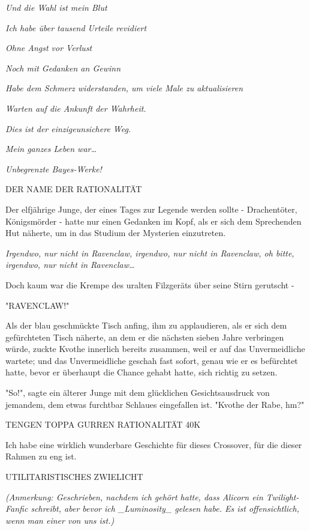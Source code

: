 {\emph{\emph{Und} \emph{die} \emph{Wahl ist mein Blut}}

\emph{Ich habe über tausend Urteile revidiert}

\emph{Ohne Angst vor Verlust}

\emph{\emph{Noch} \emph{mit Gedanken an} \emph{Gewinn}}

\emph{Habe dem Schmerz widerstanden, um viele Male zu aktualisieren}

\emph{Warten auf die Ankunft der Wahrheit.}

\emph{\emph{Dies ist der einzigeunsichere Weg.}}

\emph{Mein ganzes Leben war…}

\emph{Unbegrenzte Bayes-Werke!}

DER NAME DER RATIONALITÄT

Der elfjährige Junge, der eines Tages zur Legende werden sollte - Drachentöter, Königsmörder - hatte nur einen Gedanken im Kopf, als er sich dem Sprechenden Hut näherte, um in das Studium der Mysterien einzutreten.

\emph{Irgendwo, nur nicht in Ravenclaw, irgendwo, nur nicht in Ravenclaw, oh bitte, irgendwo, nur nicht in Ravenclaw…}

Doch kaum war die Krempe des uralten Filzgeräts über seine Stirn gerutscht -

"RAVENCLAW!"

Als der blau geschmückte Tisch anfing, ihm zu applaudieren, als er sich dem gefürchteten Tisch näherte, an dem er die nächsten sieben Jahre verbringen würde, zuckte Kvothe innerlich bereits zusammen, weil er auf das Unvermeidliche wartete; und das Unvermeidliche geschah fast sofort, genau wie er es befürchtet hatte, bevor er überhaupt die Chance gehabt hatte, sich richtig zu setzen.

"So!", sagte ein älterer Junge mit dem glücklichen Gesichtsausdruck von jemandem, dem etwas furchtbar Schlaues eingefallen ist. "Kvothe der Rabe, hm?"

TENGEN TOPPA GURREN RATIONALITÄT 40K

Ich habe eine wirklich wunderbare Geschichte für dieses Crossover, für die dieser Rahmen zu eng ist.

UTILITARISTISCHES ZWIELICHT

\emph{\emph{(Anmerkung: Geschrieben, nachdem ich gehört hatte, dass} \emph{Alicorn} \emph{ein Twilight-Fanfic} \emph{schreibt, aber bevor ich \_Luminosity\_ gelesen habe. Es ist offensichtlich, wenn man einer von uns ist.)}}

}
